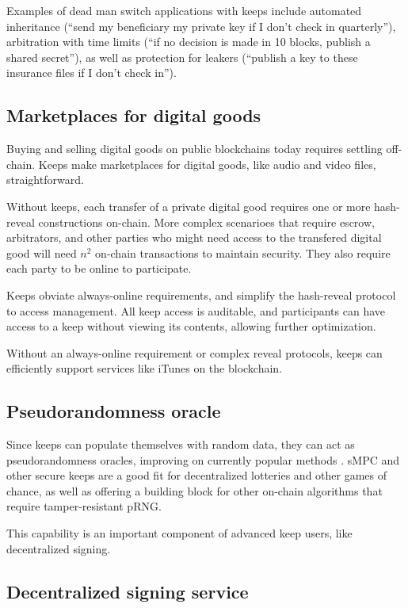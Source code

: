 \documentclass[11pt]{article}
\begin{document}
Examples of dead man switch applications with keeps include automated
inheritance (``send my beneficiary my private key if I don't check in
quarterly''), arbitration with time limits (``if no decision is made in
10 blocks, publish a shared secret''), as well as protection for
leakers (``publish a key to these insurance files if I don't check
in'').

\subsection{Marketplaces for digital goods}

Buying and selling digital goods on public blockchains today requires
settling off-chain. Keeps make marketplaces for digital goods, like
audio and video files, straightforward.

Without keeps, each transfer of a private digital good requires one or
more hash-reveal constructions on-chain. More complex scenarioes
that require escrow, arbitrators, and other parties who might need
access to the transfered digital good will need ${n^2}$ on-chain
transactions to maintain security. They also require each party to be
online to participate.

Keeps obviate always-online requirements, and simplify the hash-reveal
protocol to access management. All keep access is auditable, and
participants can have access to a keep without viewing its contents,
allowing further optimization.

Without an always-online requirement or complex reveal protocols,
keeps can efficiently support services like iTunes on the blockchain.

\subsection{Pseudorandomness oracle}

Since keeps can populate themselves with random data, they can act as
pseudorandomness oracles, improving on currently popular methods
\cite{prngStackexchange}. sMPC and other secure keeps are a good fit for
decentralized lotteries and other games of chance, as well as offering
a building block for other on-chain algorithms that require
tamper-resistant pRNG.

This capability is an important component of advanced keep users, like
decentralized signing.

\subsection{Decentralized signing service}
\end{document}
